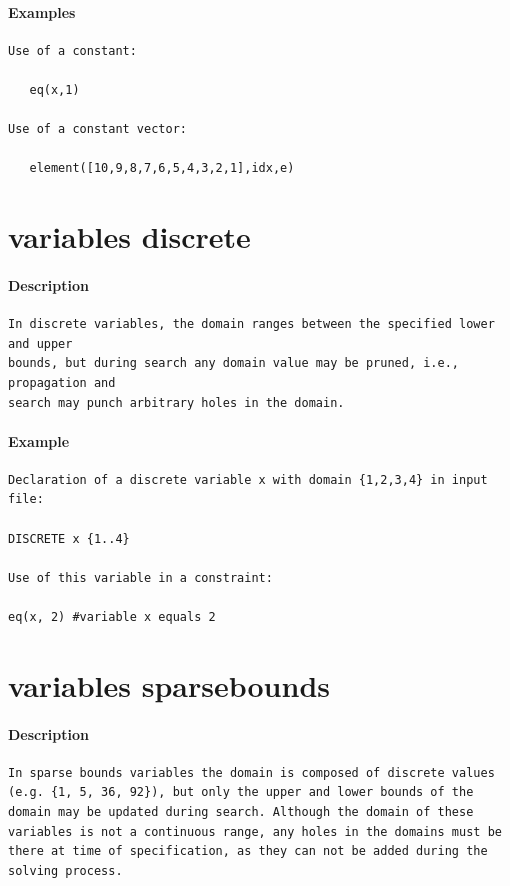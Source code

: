 \documentclass[oneside]{book}
\begin{document}
\paragraph{Examples}
{\footnotesize
\begin{verbatim}
Use of a constant:

   eq(x,1)

Use of a constant vector:

   element([10,9,8,7,6,5,4,3,2,1],idx,e) 
\end{verbatim}
}
\section{variables discrete}
\paragraph{Description}
{\footnotesize
\begin{verbatim}
In discrete variables, the domain ranges between the specified lower and upper
bounds, but during search any domain value may be pruned, i.e., propagation and
search may punch arbitrary holes in the domain.
\end{verbatim}
}
\paragraph{Example}
{\footnotesize
\begin{verbatim}
Declaration of a discrete variable x with domain {1,2,3,4} in input file:

DISCRETE x {1..4}

Use of this variable in a constraint:

eq(x, 2) #variable x equals 2
\end{verbatim}
}
\section{variables sparsebounds}
\paragraph{Description}
{\footnotesize
\begin{verbatim}
In sparse bounds variables the domain is composed of discrete values
(e.g. {1, 5, 36, 92}), but only the upper and lower bounds of the
domain may be updated during search. Although the domain of these
variables is not a continuous range, any holes in the domains must be
there at time of specification, as they can not be added during the
solving process.
\end{verbatim}
}
\end{document}

